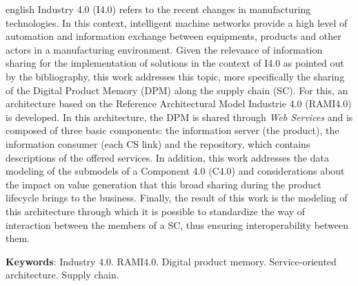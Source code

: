 \begin{resumo}[Abstract]
	\begin{otherlanguage*}{english}
		Industry 4.0 (I4.0) refers to the recent changes in manufacturing technologies. In this context, intelligent machine networks provide a high level of automation and information exchange between equipments, products and other actors in a manufacturing environment. Given the relevance of information sharing for the implementation of solutions in the context of I4.0 as pointed out by the bibliography, this work addresses this topic, more specifically the sharing of the Digital Product Memory (DPM) along the supply chain (SC). For this, an architecture based on the Reference Architectural Model Industrie 4.0 (RAMI4.0) is developed. In this architecture, the DPM is shared through \textit{Web Services} and is composed of three basic components: the information server (the product), the information consumer (each CS link) and the repository, which contains descriptions of the offered services. In addition, this work addresses the data modeling of the submodels of a Component 4.0 (C4.0) and considerations about the impact on value generation that this broad sharing during the product lifecycle brings to the business. Finally, the result of this work is the modeling of this architecture through which it is possible to standardize the way of interaction between the members of a SC, thus ensuring interoperability between them.
		\vspace{\onelineskip}

		\noindent
		\textbf{Keywords}: Industry 4.0. RAMI4.0. Digital product memory. Service-oriented architecture. Supply chain.
	\end{otherlanguage*}
\end{resumo}

\listoffigures*
\cleardoublepage

\listoftables*
\cleardoublepage

